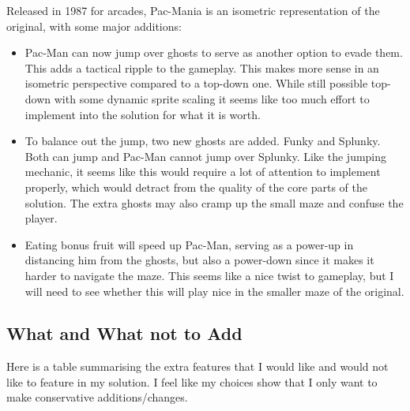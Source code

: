 \documentclass[letterpaper, 11pt]{article}
\begin{document}
Released in 1987 for arcades, Pac-Mania is an isometric representation of the original, with some major additions:

\begin{itemize}
\item Pac-Man can now jump over ghosts to serve as another option to evade them.
This adds a tactical ripple to the gameplay.
This makes more sense in an isometric perspective compared to a top-down one.
While still possible top-down with some dynamic sprite scaling it seems like too much effort to implement into the solution for what it is worth.

\item To balance out the jump, two new ghosts are added.
Funky and Splunky.
Both can jump and Pac-Man cannot jump over Splunky.
Like the jumping mechanic, it seems like this would require a lot of attention to implement properly, which would detract from the quality of the core parts of the solution.
The extra ghosts may also cramp up the small maze and confuse the player.

\item Eating bonus fruit will speed up Pac-Man, serving as a power-up in distancing him from the ghosts, but also a power-down since it makes it harder to navigate the maze.
This seems like a nice twist to gameplay, but I will need to see whether this will play nice in the smaller maze of the original.
\end{itemize}

\subsection{What and What not to Add}
\label{sec:orgfdf4a3b}
Here is a table summarising the extra features that I would like and would not like to feature in my solution.
I feel like my choices show that I only want to make conservative additions/changes.
\end{document}
